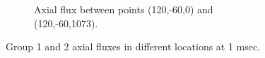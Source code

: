 \documentclass[11pt,letterpaper]{article}
\begin{document}
\begin{figure}[htbp!]
\begin{subfigure}[t]{0.4\textwidth}
			\caption{Axial flux between points (120,-60,0) and (120,-60,1073).}
		\end{subfigure}
		\hfill
		\caption{Group 1 and 2 axial fluxes in different locations at 1 msec.}
		\label{fig:3D-fullcore-homo1}
	\end{figure}


\pagebreak

% 
\end{document}
